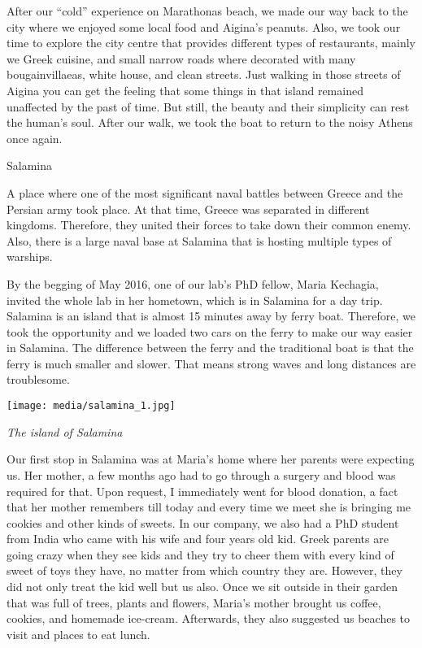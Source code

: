 \documentclass[10pt,a4paper]{article} %
\newcommand{\NewsItem}[1]{ %
\usefont{T1}{fvs}{n}{n} %
\vspace{24pt}\large #1\vspace{3pt} %
\par \normalsize \normalfont}
\begin{document}
\begin{multicols}{3}
After our ``cold'' experience on Marathonas beach, we made our way back to the city 
where we enjoyed some local food and Aigina's peanuts. 
Also, we took our time to explore the city centre that provides different types of 
restaurants, mainly we Greek cuisine,  and small narrow roads where decorated with 
many bougainvillaeas, white house, and clean streets. 
Just walking in those streets of Aigina you can get the feeling that some things 
in that island remained unaffected by the past of time. 
But still, the beauty and their simplicity can rest the human's soul. 
After our walk, we took the boat to return to the noisy Athens once again.

\NewsItem{Salamina}
A place where one of the most significant naval battles between Greece
and the Persian army took place. 
At that time, Greece was separated in different kingdoms. 
Therefore, they united their forces to take down their common enemy. 
Also, there is a large naval base at Salamina that is hosting multiple types of 
warships.

By the begging of May 2016, one of our lab's PhD fellow, Maria Kechagia, invited 
the whole lab in her hometown, which is in Salamina for a day trip. 
Salamina is an island that is almost 15 minutes away by ferry boat. 
Therefore, we took the opportunity and we loaded two cars on the ferry to make our 
way easier in Salamina. 
The difference between the ferry and the traditional boat is that the ferry is much 
smaller and slower. 
That means strong waves and long distances are troublesome.

\begin{center}
	\texttt{[image: media/salamina\_1.jpg]}
	\par\textit{The island of Salamina}
\end{center}

Our first stop in Salamina was at Maria's home where her parents were expecting us. 
Her mother, a few months ago had to go through a surgery and blood was required for 
that. 
Upon request, I immediately went for blood donation, a fact that her mother remembers 
till today and every time we meet she is bringing me cookies and other kinds of sweets. 
In our company, we also had a PhD student from India who came with his wife and 
four years old kid. 
Greek parents are going crazy when they see kids and they try to cheer them with 
every kind of sweet of toys they have, no matter from which country they are. 
However, they did not only treat the kid well but us also. 
Once we sit outside in their garden that was full of trees, plants and flowers, 
Maria's mother brought us coffee, cookies, and homemade ice-cream. 
Afterwards, they also suggested us beaches to visit and places to eat lunch.


\end{multicols}
\end{document}
